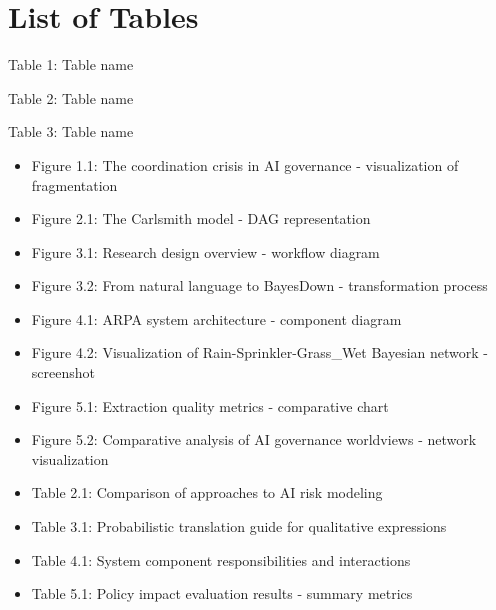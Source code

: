 \documentclass[
  letterpaper,
]{book}
\providecommand{\tightlist}{%
  \setlength{\itemsep}{0pt}\setlength{\parskip}{0pt}}
\begin{document}

\section*{List of Tables}\label{list-of-tables}


Table 1: Table name

Table 2: Table name

Table 3: Table name

\begin{itemize}
\tightlist
\item
  Figure 1.1: The coordination crisis in AI governance - visualization
  of fragmentation\\
\item
  Figure 2.1: The Carlsmith model - DAG representation\\
\item
  Figure 3.1: Research design overview - workflow diagram\\
\item
  Figure 3.2: From natural language to BayesDown - transformation
  process\\
\item
  Figure 4.1: ARPA system architecture - component diagram\\
\item
  Figure 4.2: Visualization of Rain-Sprinkler-Grass\_Wet Bayesian
  network - screenshot\\
\item
  Figure 5.1: Extraction quality metrics - comparative chart\\
\item
  Figure 5.2: Comparative analysis of AI governance worldviews - network
  visualization\\
\item
  Table 2.1: Comparison of approaches to AI risk modeling\\
\item
  Table 3.1: Probabilistic translation guide for qualitative
  expressions\\
\item
  Table 4.1: System component responsibilities and interactions\\
\item
  Table 5.1: Policy impact evaluation results - summary metrics
\end{itemize}
\end{document}
